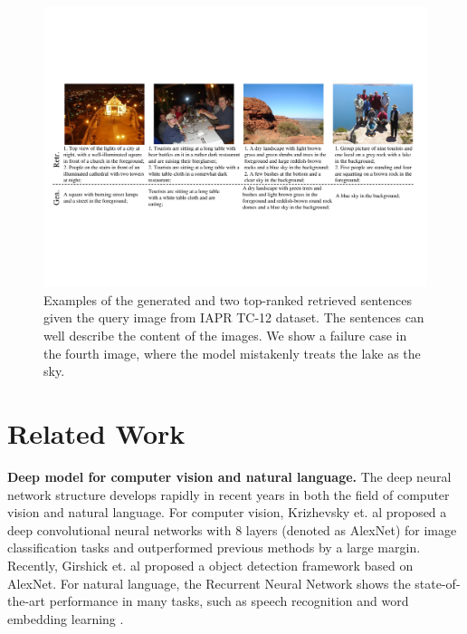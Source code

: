 
\begin{figure}[tb!]
\begin{center}
\includegraphics[width=0.98\linewidth]{PaperFigures/res_example.pdf}
\end{center}
   \caption{Examples of the generated and two top-ranked retrieved sentences given the query image from IAPR TC-12 dataset.
   The sentences can well describe the content of the images.
   We show a failure case in the fourth image, where the model mistakenly treats the lake as the sky.
   }
\label{fig:res_example}
\end{figure}

\section{Related Work}
\label{sec:related_work}

\textbf{Deep model for computer vision and natural language.}
The deep neural network structure develops rapidly in recent years in both the field of computer vision and natural language.
For computer vision, Krizhevsky et. al \cite{krizhevsky2012imagenet} proposed a deep convolutional neural networks with 8 layers (denoted as AlexNet) for image classification tasks and outperformed previous methods by a large margin.
Recently, Girshick et. al \cite{girshick2014rcnn} proposed a object detection framework based on AlexNet.
For natural language, the Recurrent Neural Network shows the state-of-the-art performance in many tasks, such as speech recognition and word embedding learning \cite{mikolov2010recurrent,mikolov2011extensions,mikolov2013distributed}.

